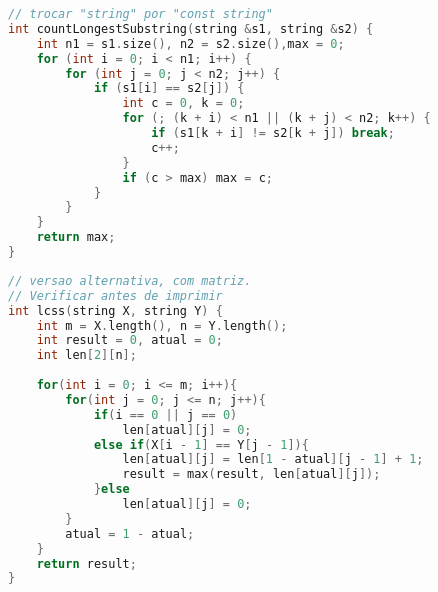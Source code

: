 \begin{lstlisting}[language=C++]
// trocar "string" por "const string"
int countLongestSubstring(string &s1, string &s2) {
    int n1 = s1.size(), n2 = s2.size(),max = 0;
    for (int i = 0; i < n1; i++) {
        for (int j = 0; j < n2; j++) {
            if (s1[i] == s2[j]) {
                int c = 0, k = 0;
                for (; (k + i) < n1 || (k + j) < n2; k++) {
                    if (s1[k + i] != s2[k + j]) break;
                    c++;
                }
                if (c > max) max = c;
            }
        }
    }
    return max;
}
\end{lstlisting}
\newpage
\begin{lstlisting}[language=C++]
// versao alternativa, com matriz.
// Verificar antes de imprimir
int lcss(string X, string Y) { 
    int m = X.length(), n = Y.length();
    int result = 0, atual = 0;
    int len[2][n];
    
    for(int i = 0; i <= m; i++){ 
        for(int j = 0; j <= n; j++){ 
            if(i == 0 || j == 0)
                len[atual][j] = 0; 
            else if(X[i - 1] == Y[j - 1]){ 
                len[atual][j] = len[1 - atual][j - 1] + 1; 
                result = max(result, len[atual][j]); 
            }else
                len[atual][j] = 0; 
        }
        atual = 1 - atual; 
    }
    return result; 
} 
\end{lstlisting}